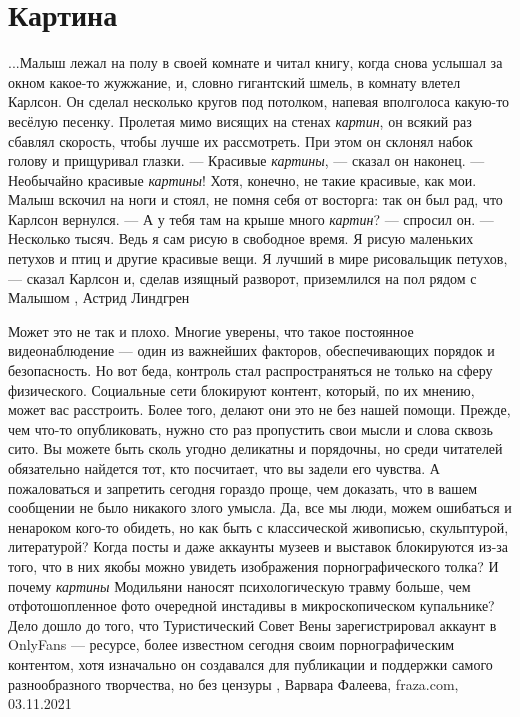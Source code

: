  
 
 
 
 
\chapter{Картина}

...Малыш лежал на полу в своей комнате и читал книгу, когда снова услышал за
окном какое-то жужжание, и, словно гигантский шмель, в комнату влетел Карлсон.
Он сделал несколько кругов под потолком, напевая вполголоса какую-то весёлую
песенку. Пролетая мимо висящих на стенах \emph{картин}, он всякий раз сбавлял
скорость, чтобы лучше их рассмотреть. При этом он склонял набок голову и
прищуривал глазки.  — Красивые \emph{картины}, — сказал он наконец. — Необычайно
красивые \emph{картины}! Хотя, конечно, не такие красивые, как мои.  Малыш вскочил на
ноги и стоял, не помня себя от восторга: так он был рад, что Карлсон вернулся.
— А у тебя там на крыше много \emph{картин}? — спросил он.  — Несколько тысяч. Ведь я
сам рисую в свободное время. Я рисую маленьких петухов и птиц и другие красивые
вещи. Я лучший в мире рисовальщик петухов, — сказал Карлсон и, сделав изящный
разворот, приземлился на пол рядом с Малышом
, Астрид Линдгрен

Может это не так и плохо. Многие уверены, что такое постоянное видеонаблюдение
— один из важнейших факторов, обеспечивающих порядок и безопасность.  Но вот
беда, контроль стал распространяться не только на сферу физического.
Социальные сети блокируют контент, который, по их мнению, может вас расстроить.
Более того, делают они это не без нашей помощи. Прежде, чем что-то
опубликовать, нужно сто раз пропустить свои мысли и слова сквозь сито. Вы
можете быть сколь угодно деликатны и порядочны, но среди читателей обязательно
найдется тот, кто посчитает, что вы задели его чувства. А пожаловаться и
запретить сегодня гораздо проще, чем доказать, что в вашем сообщении не было
никакого злого умысла.  Да, все мы люди, можем ошибаться и ненароком кого-то
обидеть, но как быть с классической живописью, скульптурой, литературой? Когда
посты и даже аккаунты музеев и выставок блокируются из-за того, что в них якобы
можно увидеть изображения порнографического толка? И почему \emph{картины}
Модильяни наносят психологическую травму больше, чем отфотошопленное фото
очередной инстадивы в микроскопическом купальнике? Дело дошло до того, что
Туристический Совет Вены зарегистрировал аккаунт в OnlyFans — ресурсе, более
известном сегодня своим порнографическим контентом, хотя изначально он
создавался для публикации и поддержки самого разнообразного творчества, но без
цензуры
, 
Варвара Фалеева, fraza.com, 03.11.2021

